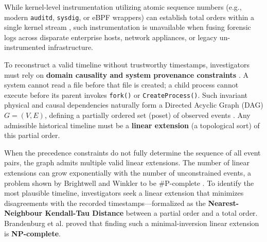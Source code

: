 \documentclass[journal]{IEEEtran}
\begin{document}
While kernel-level instrumentation utilizing atomic sequence numbers (e.g., modern \texttt{auditd}, \texttt{sysdig}, or eBPF wrappers) can establish total orders within a single kernel stream \cite{Kimm2026}, such instrumentation is unavailable when fusing forensic logs across disparate enterprise hosts, network appliances, or legacy un-instrumented infrastructure.

To reconstruct a valid timeline without trustworthy timestamps, investigators must rely on \textbf{domain causality and system provenance constraints} \cite{Hossain2017, Cheng2024}. A system cannot read a file before that file is created; a child process cannot execute before its parent invokes \texttt{fork()} or \texttt{CreateProcess()}. Such invariant physical and causal dependencies naturally form a Directed Acyclic Graph (DAG) $G = (V, E)$, defining a partially ordered set (poset) of observed events \cite{Pegoraro2020a}. Any admissible historical timeline must be a \textbf{linear extension} (a topological sort) of this partial order.

When the precedence constraints do not fully determine the sequence of all event pairs, the graph admits multiple valid linear extensions. The number of linear extensions can grow exponentially with the number of unconstrained events, a problem shown by Brightwell and Winkler to be $\#\text{P}$-complete \cite{Brightwell1991}. To identify the most plausible timeline, investigators seek a linear extension that minimizes disagreements with the recorded timestamps---formalized as the \textbf{Nearest-Neighbour Kendall-Tau Distance} between a partial order and a total order. Brandenburg et al. \cite{Brandenburg2011} proved that finding such a minimal-inversion linear extension is \textbf{NP-complete}.
\end{document}
